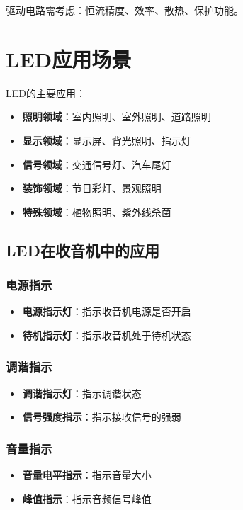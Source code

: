 驱动电路需考虑：恒流精度、效率、散热、保护功能。

\section{LED应用场景}
\label{sec:led_applications}

LED的主要应用：

\begin{itemize}
    \item \textbf{照明领域}：室内照明、室外照明、道路照明
    \item \textbf{显示领域}：显示屏、背光照明、指示灯
    \item \textbf{信号领域}：交通信号灯、汽车尾灯
    \item \textbf{装饰领域}：节日彩灯、景观照明
    \item \textbf{特殊领域}：植物照明、紫外线杀菌
\end{itemize}

\subsection{LED在收音机中的应用}

\subsubsection{电源指示}
\begin{itemize}
    \item \textbf{电源指示灯}：指示收音机电源是否开启
    \item \textbf{待机指示灯}：指示收音机处于待机状态
\end{itemize}

\subsubsection{调谐指示}
\begin{itemize}
    \item \textbf{调谐指示灯}：指示调谐状态
    \item \textbf{信号强度指示}：指示接收信号的强弱
\end{itemize}

\subsubsection{音量指示}
\begin{itemize}
    \item \textbf{音量电平指示}：指示音量大小
    \item \textbf{峰值指示}：指示音频信号峰值
\end{itemize}

